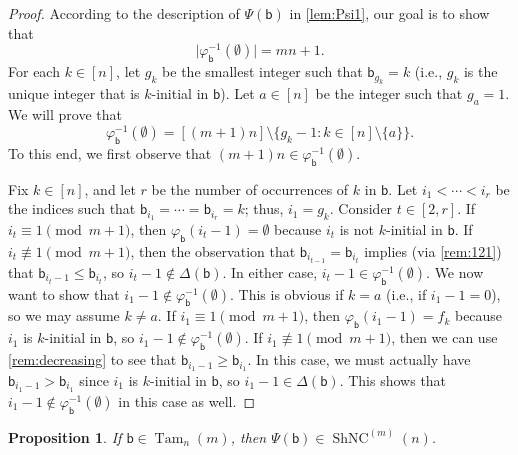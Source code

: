 \documentclass[11pt]{amsart}
\newtheorem{proposition}[theorem]{Proposition}
\theoremstyle{definition}
\DeclareMathOperator{\ShNC}{ShNC}
\DeclareMathOperator{\Tam}{Tam}
\begin{document}
\begin{proof}
According to the description of $\Psi(\mathsf b)$ in \cref{lem:Psi1}, our goal is to show that \[\lvert\varphi_{\mathsf b}^{-1}(\emptyset)\rvert=mn+1.\] For each $k\in[n]$, let $g_k$ be the smallest integer such that $\mathsf b_{g_k}=k$ (i.e., $g_k$ is the unique integer that is $k$-initial in $\mathsf b$). Let $a\in[n]$ be the integer such that $g_{a}=1$. We will prove that \[\varphi_{\mathsf b}^{-1}(\emptyset)=[(m+1)n]\setminus\{g_k-1:k\in[n]\setminus \{a\}\}.\] To this end, we first observe that $(m+1)n\in\varphi_{\mathsf b}^{-1}(\emptyset)$.

Fix $k\in[n]$, and let $r$ be the number of occurrences of $k$ in $\mathsf b$. Let $i_1<\cdots<i_r$ be the indices such that $\mathsf b_{i_1}=\cdots=\mathsf b_{i_r}=k$; thus, $i_1=g_k$. Consider $t\in[2,r]$. If $i_t\equiv 1\pmod{m+1}$, then $\varphi_{\mathsf b}(i_t-1)=\emptyset$ because $i_t$ is not $k$-initial in $\mathsf b$. If $i_t\not\equiv 1\pmod{m+1}$, then the observation that $\mathsf b_{i_{t-1}}=\mathsf b_{i_t}$ implies (via \cref{rem:121}) that $\mathsf b_{i_t-1}\leq\mathsf b_{i_t}$, so $i_t-1\not\in\Delta(\mathsf b)$. In either case, $i_t-1\in\varphi_{\mathsf b}^{-1}(\emptyset)$. We now want to show that $i_1-1\not\in\varphi_{\mathsf b}^{-1}(\emptyset)$. This is obvious if $k=a$ (i.e., if $i_1-1=0$), so we may assume $k\neq a$. If $i_1\equiv 1\pmod{m+1}$, then $\varphi_{\mathsf b}(i_1-1)=f_k$ because $i_1$ is $k$-initial in $\mathsf b$, so $i_1-1\not\in\varphi_{\mathsf b}^{-1}(\emptyset)$. If $i_1\not\equiv 1\pmod{m+1}$, then we can use \cref{rem:decreasing} to see that $\mathsf b_{i_1-1}\geq\mathsf b_{i_1}$. In this case, we must actually have $\mathsf b_{i_1-1}>\mathsf b_{i_1}$ since $i_1$ is $k$-initial in $\mathsf b$, so $i_1-1\in\Delta(\mathsf b)$. This shows that $i_1-1\not\in\varphi_{\mathsf b}^{-1}(\emptyset)$ in this case as well.   
\end{proof}

\begin{proposition}\label{prop:ShNC}
If $\mathsf b\in\Tam_n(m)$, then $\Psi(\mathsf b)\in\ShNC^{(m)}(n)$.
\end{proposition}
\end{document}
